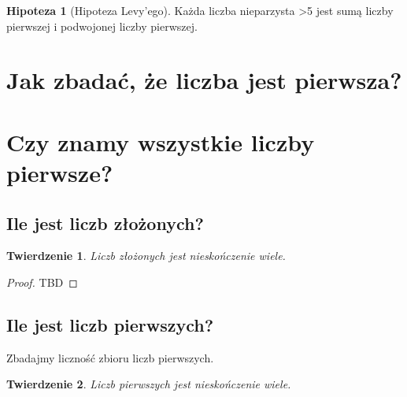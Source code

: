 \documentclass[10pt,onecolumn]{article}
\newtheorem{theorem}{Twierdzenie}
\theoremstyle{definition}
\theoremstyle{hypothesis}
\newtheorem{hypothesis}{Hipoteza}
\theoremstyle{capability}
\begin{document}
\begin{hypothesis}[Hipoteza Levy'ego]
Każda liczba nieparzysta \textgreater 5 jest sumą liczby pierwszej i podwojonej liczby pierwszej.
\label{Levy_hyp}
\end{hypothesis}

\newpage


\section{Jak zbadać, że liczba jest pierwsza?}

\newpage


\newpage

\section{Czy znamy wszystkie liczby pierwsze?}

\subsection{Ile jest liczb złożonych?}

\begin{theorem}
Liczb złożonych jest nieskończenie wiele.
\end{theorem}
 
\begin{proof}
TBD
\end{proof}

\subsection{Ile jest liczb pierwszych?}

Zbadajmy liczność zbioru liczb pierwszych.

\begin{theorem}
Liczb pierwszych jest nieskończenie wiele.
\end{theorem}
 
\end{document}
